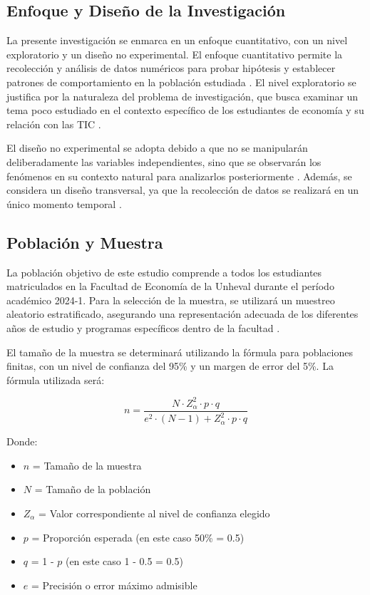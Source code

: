 \documentclass[12pt, a4paper]{article}
\begin{document}
\subsection{Enfoque y Diseño de la Investigación}

La presente investigación se enmarca en un enfoque cuantitativo, con un nivel exploratorio y un diseño no experimental. El enfoque cuantitativo permite la recolección y análisis de datos numéricos para probar hipótesis y establecer patrones de comportamiento en la población estudiada \parencite{Creswell2018}. El nivel exploratorio se justifica por la naturaleza del problema de investigación, que busca examinar un tema poco estudiado en el contexto específico de los estudiantes de economía y su relación con las TIC \parencite{Hernandez2014}.

El diseño no experimental se adopta debido a que no se manipularán deliberadamente las variables independientes, sino que se observarán los fenómenos en su contexto natural para analizarlos posteriormente \parencite{Kerlinger2002}. Además, se considera un diseño transversal, ya que la recolección de datos se realizará en un único momento temporal \parencite{Kumar2019}.

\subsection{Población y Muestra}

La población objetivo de este estudio comprende a todos los estudiantes matriculados en la Facultad de Economía de la Unheval durante el período académico 2024-1. Para la selección de la muestra, se utilizará un muestreo aleatorio estratificado, asegurando una representación adecuada de los diferentes años de estudio y programas específicos dentro de la facultad \parencite{Cochran2007}.

El tamaño de la muestra se determinará utilizando la fórmula para poblaciones finitas, con un nivel de confianza del 95\% y un margen de error del 5\%. La fórmula utilizada será:

\[n = \frac{N \cdot Z_\alpha^2 \cdot p \cdot q}{e^2 \cdot (N-1) + Z_\alpha^2 \cdot p \cdot q}\]

Donde:
\begin{itemize}
    \item $n$ = Tamaño de la muestra
    \item $N$ = Tamaño de la población
    \item $Z_\alpha$ = Valor correspondiente al nivel de confianza elegido
    \item $p$ = Proporción esperada (en este caso 50\% = 0.5)
    \item $q$ = 1 - $p$ (en este caso 1 - 0.5 = 0.5)
    \item $e$ = Precisión o error máximo admisible
\end{itemize}
\end{document}
